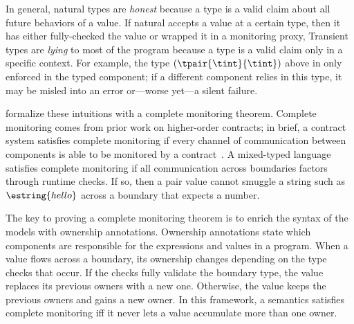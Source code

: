 In general, natural types are \emph{honest}\/ because a type is a valid
 claim about all future behaviors of a value.
If natural accepts a value at a certain type, then it has either fully-checked
 the value or wrapped it in a monitoring proxy,
Transient types are \emph{lying}\/ to most of the program because a type is
 a valid claim only in a specific context.
For example, the type $(\tpair{\tint}{\tint})$ above in only enforced in
 the typed component; if a different component relies in this type, it
 may be misled into an error or---worse yet---a silent failure.

\citet{gfd-oopsla-2019} formalize these intuitions with a complete
 monitoring theorem.
Complete monitoring comes from prior work on higher-order contracts;
 in brief, a contract system satisfies complete monitoring if every channel
 of communication between components is able to be monitored
 by a contract~\cite{dtf-esop-2012}.
A mixed-typed language satisfies complete monitoring if all communication
 across boundaries factors through runtime checks.
If so, then a pair value cannot smuggle a string such as $\estring{hello}$
 across a boundary that expects a number.

The key to proving a complete monitoring theorem is to enrich the syntax of
 the models with ownership annotations.
Ownership annotations state which components are responsible for the
 expressions and values in a program.
When a value flows across a boundary, its ownership changes depending on
 the type checks that occur.
If the checks fully validate the boundary type, the value replaces its previous
 owners with a new one.
Otherwise, the value keeps the previous owners and gains a new owner.
In this framework, a semantics satisfies complete monitoring iff it never
 lets a value accumulate more than one owner.




